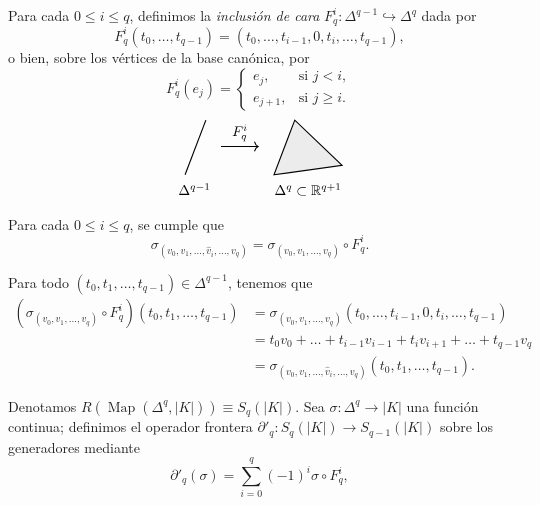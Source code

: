 \begin{definicion}
Para cada $0 \leq i \leq q$, definimos la \textit{inclusión de cara} $F_q^i \colon \Delta^{q-1} \hookrightarrow \Delta^q$ dada por
\[
F_q^i(t_0, \dots, t_{q-1}) = (t_0, \dots, t_{i-1}, 0, t_i, \dots, t_{q-1}),
\]
o bien, sobre los vértices de la base canónica, por
\[
F_q^i(e_j) =
\begin{cases}
    e_j, & \text{si } j < i, \\
    e_{j+1}, & \text{si } j \geq i.
\end{cases}
\]
\[
\begin{tikzpicture}[baseline=(current bounding box.center), scale=0.95]
    \draw[thick] (0, 0) -- (0.55, 1.45);
    \node[below] at (0.25, -0.1) {$\Delta^{q-1}$};

    \draw[->, thick] (0.95, 0.75) -- (1.95, 0.75) node[midway, above] {$F_q^i$};

    \coordinate (A) at (2.35, 0);
    \coordinate (B) at (4.15, 0.25);
    \coordinate (C) at (2.9, 1.45);

    \fill[gray!15] (A) -- (B) -- (C) -- cycle;
    \draw[thick] (A) -- (B) -- (C) -- cycle;
    \node[below] at (3.25, -0.1) {$\Delta^q \subset \mathbb{R}^{q+1}$};
\end{tikzpicture}
\]
\end{definicion}

\begin{lema}
Para cada $0 \leq i \leq q$, se cumple que
\[
\sigma_{(v_0, v_1, \dots, \hat{v}_i, \dots, v_q)} = \sigma_{(v_0, v_1, \dots, v_q)} \circ F_q^i.
\]
\end{lema}

\begin{dem}
Para todo $(t_0, t_1, \dots, t_{q-1}) \in \Delta^{q-1}$, tenemos que
\begin{align*}
(\sigma_{(v_0, v_1, \dots, v_q)} \circ F_q^i)(t_0, t_1, \dots, t_{q-1}) &= \sigma_{(v_0, v_1, \dots, v_q)}(t_0, \dots, t_{i-1}, 0, t_i, \dots, t_{q-1}) \\
&= t_0 v_0 + \dots + t_{i-1} v_{i-1} + t_i v_{i+1} + \dots + t_{q-1} v_q \\
&= \sigma_{(v_0, v_1, \dots, \hat{v}_i, \dots, v_q)}(t_0, t_1, \dots, t_{q-1}).
\end{align*}
\end{dem} 

\begin{definicion}
Denotamos $R(\operatorname{Map}(\Delta^q, |K|)) \equiv S_q(|K|)$. Sea $\sigma \colon \Delta^q \to |K|$ una función continua; definimos el operador frontera $\partial'_q \colon S_q(|K|) \to S_{q-1}(|K|)$ sobre los generadores mediante
\[
\partial'_q(\sigma) = \sum_{i=0}^q (-1)^i \sigma \circ F_q^i,
\]
\end{definicion}

